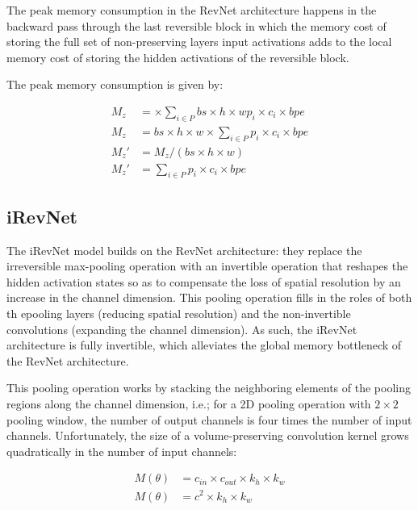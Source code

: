 \documentclass[twocolumn]{bmcart}
\begin{document}
The peak memory consumption in the RevNet architecture happens in the backward pass through the last reversible block in which the memory cost of storing the full set of non-preserving layers input activations adds to the local memory cost of storing the hidden activations of the reversible block.

The peak memory consumption is given by:

\begin{subequations}
	\begin{align}
	M_{z} &= \times \sum_{i \in P} bs \times h \times w p_i \times c_i \times bpe \\
	M_{z} &= bs \times h \times w \times \sum_{i \in P} p_i \times c_i \times bpe \\
	M_{z}' &= M_{z} / (bs \times h \times w)  \\
	M_{z}' &= \sum_{i \in P} p_i \times c_i \times bpe 
	\end{align}
\end{subequations}

\subsection{iRevNet}

The iRevNet model builds on the RevNet architecture: they replace the irreversible max-pooling operation with an invertible operation that reshapes the hidden activation states
so as to compensate the loss of spatial resolution by an increase in the channel dimension. 
This pooling operation fills in the roles of both th epooling layers (reducing spatial resolution) and the non-invertible convolutions (expanding the channel dimension). As such, the iRevNet architecture is fully invertible, which alleviates the global memory bottleneck of the RevNet architecture.

This pooling operation works by stacking the neighboring elements of the pooling regions along the channel dimension, 
i.e.; for a 2D pooling operation with $2 \times 2$ pooling window, the number of output channels is four times the number of input channels. 
Unfortunately, the size of a volume-preserving convolution kernel grows quadratically in the number of input channels:

\begin{subequations}
	\begin{align}
	M(\theta) &= c_{in} \times c_{out} \times k_h \times k_w \\
	M(\theta) &= c^2 \times k_h \times k_w
	\end{align}
\end{subequations}
\end{document}
